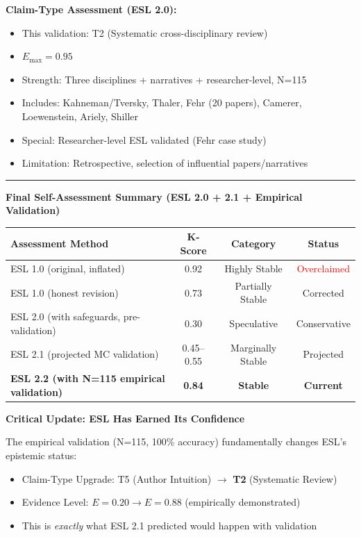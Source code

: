 \documentclass[11pt,a4paper]{article}
\begin{document}
\textbf{Claim-Type Assessment (ESL 2.0):}
\begin{itemize}
    \item This validation: T2 (Systematic cross-disciplinary review)
    \item $E_{\max} = 0.95$
    \item Strength: Three disciplines + narratives + researcher-level, N=115
    \item Includes: Kahneman/Tversky, Thaler, Fehr (20 papers), Camerer, Loewenstein, Ariely, Shiller
    \item Special: Researcher-level ESL validated (Fehr case study)
    \item Limitation: Retrospective, selection of influential papers/narratives
\end{itemize}


\vspace{2em}
\begin{center}
\rule{0.5\textwidth}{0.4pt}
\end{center}
\vspace{1em}

\noindent\textbf{Final Self-Assessment Summary (ESL 2.0 + 2.1 + Empirical Validation)}

\begin{table}[h]
\centering
\begin{tabular}{lccc}
\toprule
\textbf{Assessment Method} & \textbf{K-Score} & \textbf{Category} & \textbf{Status} \\
\midrule
ESL 1.0 (original, inflated) & 0.92 & Highly Stable & \textcolor{red}{Overclaimed} \\
ESL 1.0 (honest revision) & 0.73 & Partially Stable & Corrected \\
ESL 2.0 (with safeguards, pre-validation) & 0.30 & Speculative & Conservative \\
ESL 2.1 (projected MC validation) & 0.45--0.55 & Marginally Stable & Projected \\
\textbf{ESL 2.2 (with N=115 empirical validation)} & \textbf{0.84} & \textbf{Stable} & \textcolor{green!60!black}{\textbf{Current}} \\
\bottomrule
\end{tabular}
\end{table}

\begin{resultbox}
\textbf{Critical Update: ESL Has Earned Its Confidence}

The empirical validation (N=115, 100\% accuracy) fundamentally changes ESL's epistemic status:
\begin{itemize}
    \item Claim-Type Upgrade: T5 (Author Intuition) $\to$ \textbf{T2} (Systematic Review)
    \item Evidence Level: $E = 0.20 \to E = 0.88$ (empirically demonstrated)
    \item This is \textit{exactly} what ESL 2.1 predicted would happen with validation
\end{itemize}
\end{resultbox}
\end{document}

